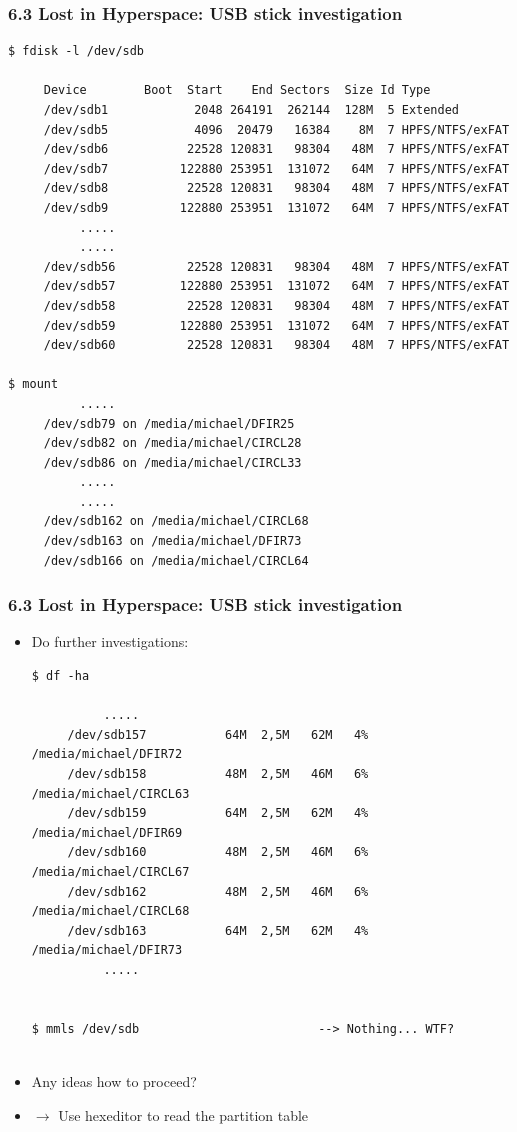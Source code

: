 \begin{frame}[fragile]
    \frametitle{6.3 Lost in Hyperspace: USB stick investigation}
  \begin{lstlisting}[basicstyle=\tiny]
$ fdisk -l /dev/sdb

     Device        Boot  Start    End Sectors  Size Id Type
     /dev/sdb1            2048 264191  262144  128M  5 Extended
     /dev/sdb5            4096  20479   16384    8M  7 HPFS/NTFS/exFAT
     /dev/sdb6           22528 120831   98304   48M  7 HPFS/NTFS/exFAT
     /dev/sdb7          122880 253951  131072   64M  7 HPFS/NTFS/exFAT
     /dev/sdb8           22528 120831   98304   48M  7 HPFS/NTFS/exFAT
     /dev/sdb9          122880 253951  131072   64M  7 HPFS/NTFS/exFAT
          .....
          .....
     /dev/sdb56          22528 120831   98304   48M  7 HPFS/NTFS/exFAT
     /dev/sdb57         122880 253951  131072   64M  7 HPFS/NTFS/exFAT
     /dev/sdb58          22528 120831   98304   48M  7 HPFS/NTFS/exFAT
     /dev/sdb59         122880 253951  131072   64M  7 HPFS/NTFS/exFAT
     /dev/sdb60          22528 120831   98304   48M  7 HPFS/NTFS/exFAT

$ mount
          .....
     /dev/sdb79 on /media/michael/DFIR25
     /dev/sdb82 on /media/michael/CIRCL28
     /dev/sdb86 on /media/michael/CIRCL33 
          .....
          .....
     /dev/sdb162 on /media/michael/CIRCL68
     /dev/sdb163 on /media/michael/DFIR73
     /dev/sdb166 on /media/michael/CIRCL64
  \end{lstlisting}
\end{frame}


\begin{frame}[fragile]
    \frametitle{6.3 Lost in Hyperspace: USB stick investigation}
    \begin{itemize}
	    \item[] Do further investigations:
  \begin{lstlisting}[basicstyle=\tiny]
$ df -ha

          .....
     /dev/sdb157           64M  2,5M   62M   4% /media/michael/DFIR72
     /dev/sdb158           48M  2,5M   46M   6% /media/michael/CIRCL63
     /dev/sdb159           64M  2,5M   62M   4% /media/michael/DFIR69
     /dev/sdb160           48M  2,5M   46M   6% /media/michael/CIRCL67
     /dev/sdb162           48M  2,5M   46M   6% /media/michael/CIRCL68
     /dev/sdb163           64M  2,5M   62M   4% /media/michael/DFIR73
          .....


$ mmls /dev/sdb                         --> Nothing... WTF?


  \end{lstlisting}
	    \item[] Any ideas how to proceed?
	    \item[] $\to$ Use hexeditor to read the partition table
    \end{itemize}
\end{frame}


